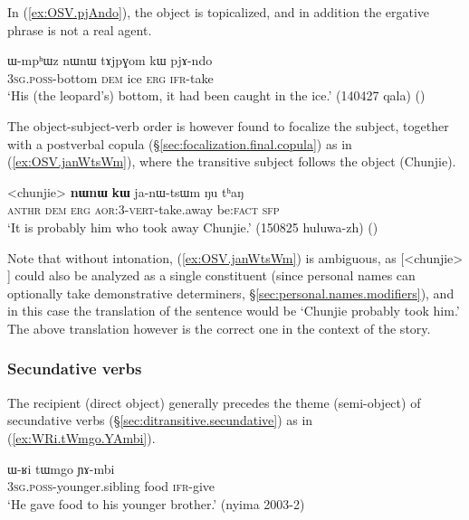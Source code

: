 In (\ref{ex:OSV.pjAndo}), the object  is topicalized, and in addition the ergative phrase  is not a real agent.

\begin{exe}
\ex \label{ex:OSV.pjAndo}
\gll  ɯ-mpʰɯz nɯnɯ tɤjpɣom kɯ pjɤ-ndo \\
\textsc{3sg}.\textsc{poss}-bottom \textsc{dem} ice \textsc{erg} \textsc{ifr}-take \\
\glt `His (the leopard's) bottom, it had been caught in the ice.' (140427 qala)
()
\end{exe}
 
The object-subject-verb order is however found to focalize the subject, together with a postverbal copula (§\ref{sec:focalization.final.copula}) as in  (\ref{ex:OSV.janWtsWm}), where the transitive subject  follows the object (Chunjie). 

 
\begin{exe}
\ex \label{ex:OSV.janWtsWm}
\gll <chunjie> \textbf{nɯnɯ} \textbf{kɯ} ja-nɯ-tsɯm ŋu tʰaŋ \\
\textsc{anthr} \textsc{dem} \textsc{erg} \textsc{aor}:3\flobv{}-\textsc{vert}-take.away be:\textsc{fact} \textsc{sfp} \\
\glt `It is probably him who took away Chunjie.' (150825 huluwa-zh)
()
\end{exe}

Note that without intonation, (\ref{ex:OSV.janWtsWm}) is ambiguous, as [<chunjie> ] could also be analyzed as a single constituent (since personal names can optionally take demonstrative determiners, §\ref{sec:personal.names.modifiers}), and in this case the translation of the sentence would be `Chunjie probably took him.' The above translation however is the correct one in the context of the story.


\subsubsection{Secundative verbs} \label{sec:secundative.word.order}
The recipient (direct object) generally precedes the theme (semi-object) of secundative verbs (§\ref{sec:ditransitive.secundative}) as in (\ref{ex:WRi.tWmgo.YAmbi}).


\begin{exe}
\ex \label{ex:WRi.tWmgo.YAmbi}
\gll ɯ-ʁi tɯmgo ɲɤ-mbi \\
\textsc{3sg}.\textsc{poss}-younger.sibling food \textsc{ifr}-give \\
\glt `He gave food to his younger brother.' (nyima 2003-2)
\end{exe}

